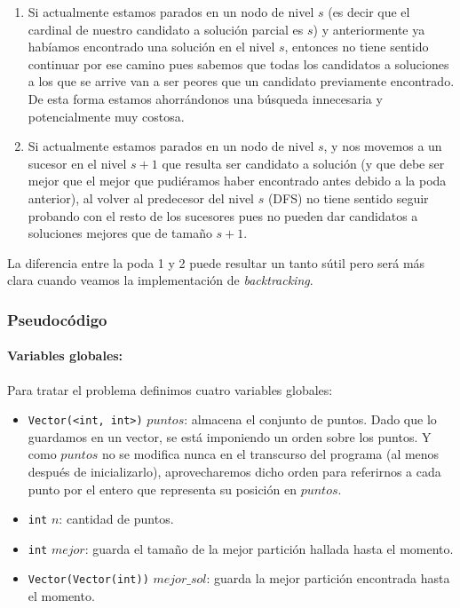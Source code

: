 \begin{enumerate}
  \item Si actualmente estamos parados en un nodo de nivel $s$ (es decir que el cardinal de nuestro candidato a solución parcial es $s$) y anteriormente ya habíamos encontrado una solución en el nivel $s$, entonces no tiene sentido continuar por ese camino pues sabemos que todas los candidatos a soluciones a los que se arrive van a ser peores que un candidato previamente encontrado. De esta forma estamos ahorrándonos una búsqueda innecesaria y potencialmente muy costosa.
  \item Si actualmente estamos parados en un nodo de nivel $s$, y nos movemos a un sucesor en el nivel $s+1$ que resulta ser candidato a solución (y que debe ser mejor que el mejor que pudiéramos haber encontrado antes debido a la poda anterior), al volver al predecesor del nivel $s$ (DFS) no tiene sentido seguir probando con el resto de los sucesores pues no pueden dar candidatos a soluciones mejores que de tamaño $s+1$.
\end{enumerate}

La diferencia entre la poda 1 y 2 puede resultar un tanto sútil pero será más clara cuando veamos la implementación de \textit{backtracking}.

\subsubsection{Pseudocódigo}
  \paragraph{Variables globales:} Para tratar el problema definimos cuatro variables globales:
  \begin{itemize}
    \item \texttt{Vector(<int, int>)} $puntos$: almacena el conjunto de puntos. Dado que lo guardamos en un vector, se está imponiendo un orden sobre los puntos. Y como $puntos$ no se modifica nunca en el transcurso del programa (al menos después de inicializarlo), aprovecharemos dicho orden para referirnos a cada punto por el entero que representa su posición en $puntos$.
    \item \texttt{int} $n$: cantidad de puntos.
    \item \texttt{int} $mejor$: guarda el tamaño de la mejor partición hallada hasta el momento.
    \item \texttt{Vector(Vector(int))} $mejor\_sol$: guarda la mejor partición encontrada hasta el momento.
  \end{itemize}
